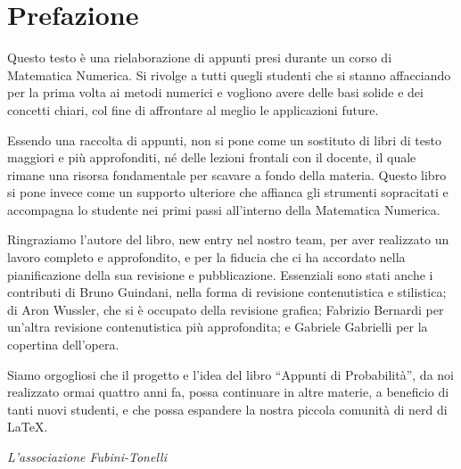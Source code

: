 \vspace*{1.2cm}
\section*{Prefazione}

Questo testo è una rielaborazione di appunti presi durante un corso di Matematica Numerica. Si rivolge a tutti quegli studenti che si stanno affacciando per la prima volta ai metodi numerici e vogliono avere delle basi solide e dei concetti chiari, col fine di affrontare al meglio le applicazioni future. 

Essendo una raccolta di appunti, non si pone come un sostituto di libri di testo maggiori e più approfonditi, né delle lezioni frontali con il docente, il quale rimane una risorsa fondamentale per scavare a fondo della materia. Questo libro si pone invece come un supporto ulteriore che affianca gli strumenti sopracitati e accompagna lo studente nei primi passi all'interno della Matematica Numerica.

Ringraziamo l'autore del libro, new entry nel nostro team, per aver realizzato un lavoro completo e approfondito, e per la fiducia che ci ha accordato nella pianificazione della sua revisione e pubblicazione.
Essenziali sono stati anche i contributi di Bruno Guindani, nella forma di revisione contenutistica e stilistica; di Aron Wussler, che si è occupato della revisione grafica; Fabrizio Bernardi per un'altra revisione contenutistica più approfondita; e Gabriele Gabrielli per la copertina dell'opera.

Siamo orgogliosi che il progetto e l'idea del libro ``Appunti di Probabilità'', da noi realizzato ormai quattro anni fa, possa continuare in altre materie, a beneficio di tanti nuovi studenti, e che possa espandere la nostra piccola comunità di nerd di \LaTeX. \\
\begin{flushright}
\textit{L'associazione Fubini-Tonelli}\hspace*{0.5cm}
\end{flushright}